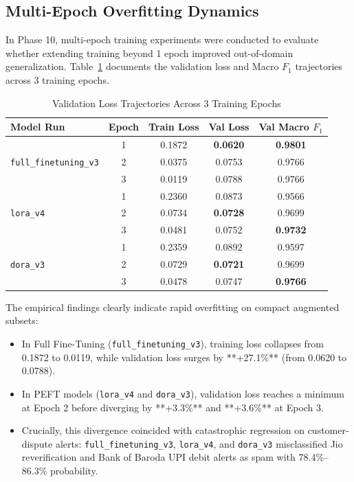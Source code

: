 \documentclass[conference]{IEEEtran}
\begin{document}
\subsection{Multi-Epoch Overfitting Dynamics}
In Phase 10, multi-epoch training experiments were conducted to evaluate whether extending training beyond 1 epoch improved out-of-domain generalization. Table~\ref{tab:epoch_histories} documents the validation loss and Macro $F_1$ trajectories across 3 training epochs.

\begin{table}[t]
\caption{Validation Loss Trajectories Across 3 Training Epochs}
\label{tab:epoch_histories}
\centering
\begin{tabularx}{\columnwidth}{lcccc}
\toprule
\textbf{Model Run} & \textbf{Epoch} & \textbf{Train Loss} & \textbf{Val Loss} & \textbf{Val Macro $F_1$} \\
\midrule
\multirow{3}{*}{\texttt{full\_finetuning\_v3}} & 1 & 0.1872 & \textbf{0.0620} & \textbf{0.9801} \\
 & 2 & 0.0375 & 0.0753 & 0.9766 \\
 & 3 & 0.0119 & 0.0788 & 0.9766 \\
\midrule
\multirow{3}{*}{\texttt{lora\_v4}} & 1 & 0.2360 & 0.0873 & 0.9566 \\
 & 2 & 0.0734 & \textbf{0.0728} & 0.9699 \\
 & 3 & 0.0481 & 0.0752 & \textbf{0.9732} \\
\midrule
\multirow{3}{*}{\texttt{dora\_v3}} & 1 & 0.2359 & 0.0892 & 0.9597 \\
 & 2 & 0.0729 & \textbf{0.0721} & 0.9699 \\
 & 3 & 0.0478 & 0.0747 & \textbf{0.9766} \\
\bottomrule
\end{tabularx}
\end{table}

The empirical findings clearly indicate rapid overfitting on compact augmented subsets:
\begin{itemize}
    \item In Full Fine-Tuning (\texttt{full\_finetuning\_v3}), training loss collapses from 0.1872 to 0.0119, while validation loss surges by **+27.1\%** (from 0.0620 to 0.0788).
    \item In PEFT models (\texttt{lora\_v4} and \texttt{dora\_v3}), validation loss reaches a minimum at Epoch 2 before diverging by **+3.3\%** and **+3.6\%** at Epoch 3.
    \item Crucially, this divergence coincided with catastrophic regression on customer-dispute alerts: \texttt{full\_finetuning\_v3}, \texttt{lora\_v4}, and \texttt{dora\_v3} misclassified Jio reverification and Bank of Baroda UPI debit alerts as spam with 78.4\%--86.3\% probability.
\end{itemize}
\end{document}
